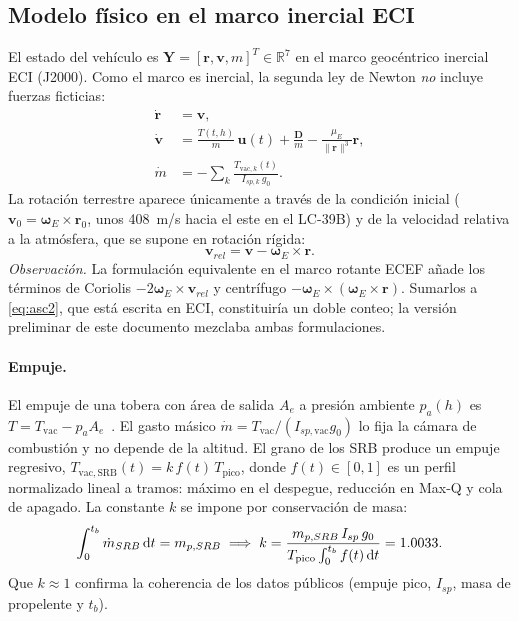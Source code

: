 \documentclass[11pt,a4paper]{article}
\newcommand{\vect}[1]{\mathbf{#1}}
\newcommand{\uvec}[1]{\hat{\mathbf{#1}}}
\newcommand{\dd}{\mathrm{d}}
\begin{document}
\subsection{Modelo físico en el marco inercial ECI}
El estado del vehículo es $\vect Y=[\vect r,\vect v,m]^T\in\mathbb R^7$ en el marco geocéntrico inercial ECI (J2000). Como el marco es inercial, la segunda ley de Newton \emph{no} incluye fuerzas ficticias:
\begin{align}
\dot{\vect r} &= \vect v, \label{eq:asc1}\\
\dot{\vect v} &= \frac{T(t,h)}{m}\,\uvec u(t) + \frac{\vect D}{m} - \frac{\mu_E}{\|\vect r\|^3}\vect r, \label{eq:asc2}\\
\dot m &= -\sum_k \frac{T_{\mathrm{vac},k}(t)}{I_{sp,k}\,g_0}. \label{eq:asc3}
\end{align}
La rotación terrestre aparece únicamente a través de la condición inicial ($\vect v_0=\vect\omega_E\times\vect r_0$, unos \SI{408}{m/s} hacia el este en el LC-39B) y de la velocidad relativa a la atmósfera, que se supone en rotación rígida:
\begin{equation}
\vect v_{rel} = \vect v - \vect\omega_E\times\vect r .
\end{equation}
\emph{Observación.} La formulación equivalente en el marco rotante ECEF añade los términos de Coriolis $-2\vect\omega_E\times\vect v_{rel}$ y centrífugo $-\vect\omega_E\times(\vect\omega_E\times\vect r)$. Sumarlos a \eqref{eq:asc2}, que está escrita en ECI, constituiría un doble conteo; la versión preliminar de este documento mezclaba ambas formulaciones.

\paragraph{Empuje.} El empuje de una tobera con área de salida $A_e$ a presión ambiente $p_a(h)$ es $T=T_{\mathrm{vac}}-p_a A_e$~\cite{sutton2017}. El gasto másico $\dot m=T_{\mathrm{vac}}/(I_{sp,\mathrm{vac}}g_0)$ lo fija la cámara de combustión y no depende de la altitud. El grano de los SRB produce un empuje regresivo, $T_{\mathrm{vac,SRB}}(t)=k\,f(t)\,T_{\mathrm{pico}}$, donde $f(t)\in[0,1]$ es un perfil normalizado lineal a tramos: máximo en el despegue, reducción en Max-Q y cola de apagado. La constante $k$ se impone por conservación de masa:
\begin{equation}
\int_0^{t_b}\dot m_{SRB}\,\dd t = m_{p,SRB}
\;\Longrightarrow\;
k=\frac{m_{p,SRB}\,I_{sp}\,g_0}{T_{\mathrm{pico}}\int_0^{t_b} f(t)\,\dd t}=\RSrbScale .
\end{equation}
Que $k\approx1$ confirma la coherencia de los datos públicos (empuje pico, $I_{sp}$, masa de propelente y $t_b$).
\end{document}
